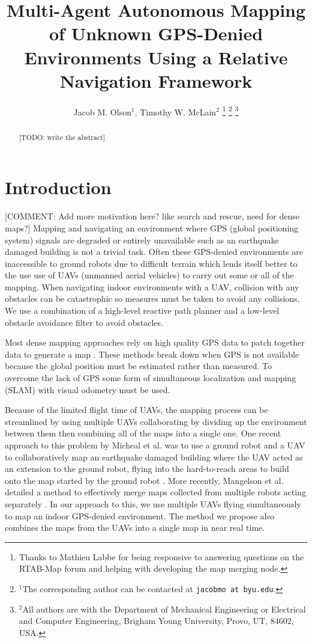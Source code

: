 \documentclass[letterpaper, 10 pt, conference]{ieeeconf}  %
\title{\LARGE \bf
Multi-Agent Autonomous Mapping of Unknown GPS-Denied Environments Using a Relative Navigation Framework}
\author{Jacob M. Olson$^{1}$, Timothy W. McLain$^{2}$%
\thanks{Thanks to Mathieu Labbe for being responsive to answering questions on the RTAB-Map forum and helping with developing the map merging node.}%
\thanks{$^{1}$The corresponding author can be contacted at
        {\tt\small jacobmo at byu.edu}.}%
\thanks{$^{2}$All authors are with the Department of Mechanical Engineering or Electrical and Computer Engineering,
        Brigham Young University, Provo, UT, 84602, USA.}%
}
\newcommand{\todo}[1]{{\color{blue}[TODO: #1]}}
\newcommand{\comment}[1]{{\color{red}[COMMENT: #1]}}
\begin{document}
\maketitle
\thispagestyle{empty}
\pagestyle{empty}


\begin{abstract}

\todo{write the abstract}

\end{abstract}


\section{Introduction}

\comment{Add more motivation here? like search and rescue, need for dense maps?}
Mapping and navigating an environment where GPS (global positioning system) signals are degraded or entirely unavailable such as an earthquake damaged building is not a trivial task. Often these GPS-denied environments are inaccessible to ground robots due to difficult terrain which lends itself better to the use use of UAVs (unmanned aerial vehicles) to carry out some or all of the mapping. When navigating indoor environments with a UAV, collision with any obstacles can be catastrophic so measures must be taken to avoid any collisions. We use a combination of a high-level reactive path planner and a low-level obstacle avoidance filter to avoid obstacles.

Most dense mapping approaches rely on high quality GPS data to patch together data to generate a map \cite{Siebert2014, Martin2015}. These methods break down when GPS is not available because the global position must be estimated rather than measured. To overcome the lack of GPS some form of simultaneous localization and mapping (SLAM) with visual odometry must be used.

Because of the limited flight time of UAVs, the mapping process can be streamlined by using multiple UAVs collaborating by dividing up the environment between them then combining all of the maps into a single one. One recent approach to this problem by Micheal et al. was to use a ground robot and a UAV to collaboratively map an earthquake damaged building where the UAV acted as an extension to the ground robot, flying into the hard-to-reach areas to build onto the map started by the ground robot \cite{Michael2012}. More recently, Mangelson et al. detailed a method to effectively merge maps collected from multiple robots acting separately \cite{Mangelson2018}. In our approach to this, we use multiple UAVs flying simultaneously to map an indoor GPS-denied environment. The method we propose also combines the maps from the UAVs into a single map in near real time.
\end{document}

